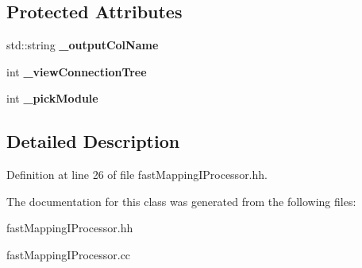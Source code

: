 \subsection*{Protected Attributes}
\begin{DoxyCompactItemize}
\item 
std::string {\bfseries \_\-outputColName}\label{classCALICE_1_1fastMappingIProcessor_a8c3d3a56fa6562d42d5232e1d59793d5}

\item 
int {\bfseries \_\-viewConnectionTree}\label{classCALICE_1_1fastMappingIProcessor_a0c9ffa75645122f519a515e0cc9f03c4}

\item 
int {\bfseries \_\-pickModule}\label{classCALICE_1_1fastMappingIProcessor_a60b71c57578009091da75ae814ac787b}

\end{DoxyCompactItemize}


\subsection{Detailed Description}


Definition at line 26 of file fastMappingIProcessor.hh.

The documentation for this class was generated from the following files:\begin{DoxyCompactItemize}
\item 
fastMappingIProcessor.hh\item 
fastMappingIProcessor.cc\end{DoxyCompactItemize}
